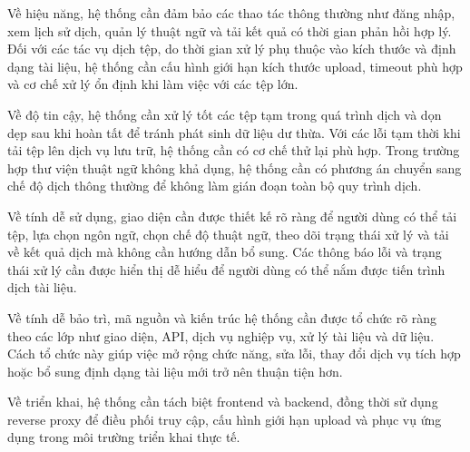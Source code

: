 \documentclass[../DoAn.tex]{subfiles}
\begin{document}
Về hiệu năng, hệ thống cần đảm bảo các thao tác thông thường như đăng nhập, xem lịch sử dịch, quản lý thuật ngữ và tải kết quả có thời gian phản hồi hợp lý. Đối với các tác vụ dịch tệp, do thời gian xử lý phụ thuộc vào kích thước và định dạng tài liệu, hệ thống cần cấu hình giới hạn kích thước upload, timeout phù hợp và cơ chế xử lý ổn định khi làm việc với các tệp lớn.

Về độ tin cậy, hệ thống cần xử lý tốt các tệp tạm trong quá trình dịch và dọn dẹp sau khi hoàn tất để tránh phát sinh dữ liệu dư thừa. Với các lỗi tạm thời khi tải tệp lên dịch vụ lưu trữ, hệ thống cần có cơ chế thử lại phù hợp. Trong trường hợp thư viện thuật ngữ không khả dụng, hệ thống cần có phương án chuyển sang chế độ dịch thông thường để không làm gián đoạn toàn bộ quy trình dịch.

Về tính dễ sử dụng, giao diện cần được thiết kế rõ ràng để người dùng có thể tải tệp, lựa chọn ngôn ngữ, chọn chế độ thuật ngữ, theo dõi trạng thái xử lý và tải về kết quả dịch mà không cần hướng dẫn bổ sung. Các thông báo lỗi và trạng thái xử lý cần được hiển thị dễ hiểu để người dùng có thể nắm được tiến trình dịch tài liệu.

Về tính dễ bảo trì, mã nguồn và kiến trúc hệ thống cần được tổ chức rõ ràng theo các lớp như giao diện, API, dịch vụ nghiệp vụ, xử lý tài liệu và dữ liệu. Cách tổ chức này giúp việc mở rộng chức năng, sửa lỗi, thay đổi dịch vụ tích hợp hoặc bổ sung định dạng tài liệu mới trở nên thuận tiện hơn.

Về triển khai, hệ thống cần tách biệt frontend và backend, đồng thời sử dụng reverse proxy để điều phối truy cập, cấu hình giới hạn upload và phục vụ ứng dụng trong môi trường triển khai thực tế. 
\end{document}
